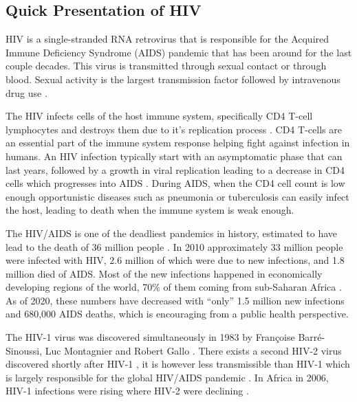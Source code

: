 \documentclass[
  11pt,
  twoside,
  BCOR=10mm,
  listof=totoc]{scrbook}
\begin{document}
\hypertarget{quick-presentation-of-hiv}{%
\subsection{Quick Presentation of HIV}\label{quick-presentation-of-hiv}}

HIV is a single-stranded RNA retrovirus that is responsible for the Acquired Immune Deficiency Syndrome (AIDS) pandemic that has been around for the last couple decades. This virus is transmitted through sexual contact or through blood. Sexual activity is the largest transmission factor followed by intravenous drug use \autocite{hladikSettingStageHost2008,shawHIVTransmission2012}.

The HIV infects cells of the host immune system, specifically CD4 T-cell lymphocytes and destroys them due to it's replication process \autocite{weissHowDoesHIV1993}. CD4 T-cells are an essential part of the immune system response helping fight against infection in humans. An HIV infection typically start with an asymptomatic phase that can last years, followed by a growth in viral replication leading to a decrease in CD4 cells which progresses into AIDS \autocite{melhuishNaturalHistoryHIV2018}. During AIDS, when the CD4 cell count is low enough opportunistic diseases such as pneumonia or tuberculosis \autocite{murrayPulmonaryComplicationsAcquired1984} can easily infect the host, leading to death when the immune system is weak enough.

The HIV/AIDS is one of the deadliest pandemics in history, estimated to have lead to the death of 36 million people \autocite{sampathPandemicsThroughoutHistory2021}. In 2010 \autocite{worldhealthorganizationGlobalReportUNAIDS2010} approximately 33 million people were infected with HIV, 2.6 million of which were due to new infections, and 1.8 million died of AIDS. Most of the new infections happened in economically developing regions of the world, 70\% of them coming from sub-Saharan Africa \autocite{worldhealthorganizationGlobalReportUNAIDS2010}. As of 2020, these numbers have decreased with ``only'' 1.5 million new infections and 680,000 AIDS deaths, which is encouraging from a public health perspective.

The HIV-1 virus was discovered simultaneously in 1983 by Françoise Barré-Sinoussi, Luc Montagnier \autocite{barre-sinoussiIsolationTlymphotropicRetrovirus1983} and Robert Gallo \autocite{galloIsolationHumanTcell1983}. There exists a second HIV-2 virus discovered shortly after HIV-1 \autocite{clavelIsolationNewHuman1986}, it is however less transmissible than HIV-1 which is largely responsible for the global HIV/AIDS pandemic \autocite{gilbert2003}. In Africa in 2006, HIV-1 infections were rising where HIV-2 were declining \autocite{vanderloeffSixteenYearsHIV2006}.
\end{document}
